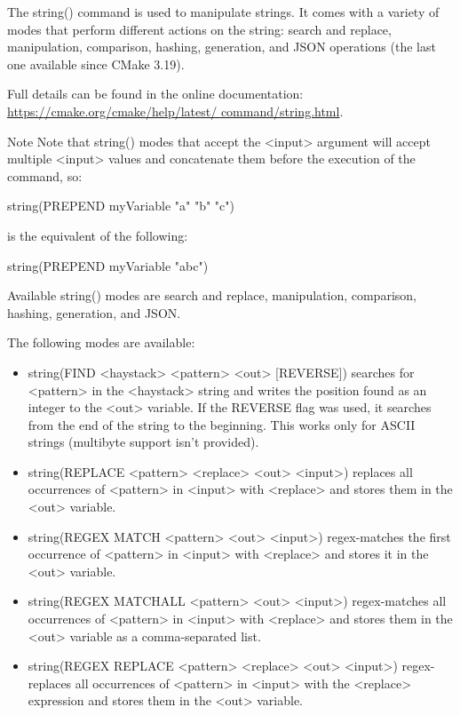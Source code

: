 

The string() command is used to manipulate strings. It comes with a variety of modes that perform different actions on the string: search and replace, manipulation, comparison, hashing, generation, and JSON operations (the last one available since CMake 3.19).

Full details can be found in the online documentation: \url{https://cmake.org/cmake/help/latest/ command/string.html}.

\begin{myNotic}{Note}
Note that string() modes that accept the <input> argument will accept multiple <input> values and concatenate them before the execution of the command, so:

\begin{cmake}
string(PREPEND myVariable "a" "b" "c")
\end{cmake}

is the equivalent of the following:

\begin{cmake}
string(PREPEND myVariable "abc")
\end{cmake}
\end{myNotic}

Available string() modes are search and replace, manipulation, comparison, hashing, generation, and JSON.


The following modes are available:

\begin{itemize}
\item
string(FIND <haystack> <pattern> <out> [REVERSE]) searches for <pattern> in the <haystack> string and writes the position found as an integer to the <out> variable. If the REVERSE flag was used, it searches from the end of the string to the beginning. This works only for ASCII strings (multibyte support isn’t provided).

\item
string(REPLACE <pattern> <replace> <out> <input>) replaces all occurrences of <pattern> in <input> with <replace> and stores them in the <out> variable.

\item
string(REGEX MATCH <pattern> <out> <input>) regex-matches the first occurrence of <pattern> in <input> with <replace> and stores it in the <out> variable.

\item
string(REGEX MATCHALL <pattern> <out> <input>) regex-matches all occurrences of <pattern> in <input> with <replace> and stores them in the <out> variable as a comma-separated list.

\item
string(REGEX REPLACE <pattern> <replace> <out> <input>) regex-replaces all occurrences of <pattern> in <input> with the <replace> expression and stores them in the <out> variable.
\end{itemize}

